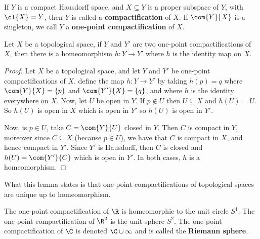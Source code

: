 \begin{definition}
    If $Y$ is a compact Hausdorff space, and  $X \subseteq Y$ is a proper
    subspace of  $Y$, with  $\cl{X}=Y$, then $Y$ is called a
    \textbf{compactification} of $X$. If  $\com{Y}{X}$ is a singleton, we call
    $Y$ a  \textbf{one-point compactification} of $X$.
\end{definition}

\begin{lemma}\label{3.8.2}
    Let $X$ be a topological space, if $Y$ and $Y'$ are two one-point
    compactifications of $X$, then there is a homeomorphism $h:Y \rightarrow Y'$
    where $h$ is the identity map on  $X$.
\end{lemma}
\begin{proof}
    Let $X$ be a topological space, and let  $Y$ and  $Y'$ be one-point
    compactifications of  $X$. define the map $h:Y \rightarrow Y'$ by taking
    $h(p)=q$ where $\com{Y}{X}=\{p\}$ and $\com{Y'}{X}=\{q\}$, and where $h$ is
    the identity everywhere on  $X$. Now, let  $U$ be open in  $Y$. If $p
    \notin U$ then  $U \subseteq X$ and  $h(U)=U$. So $h(U)$ is open in  $X$
    which is open in $Y'$ so $h(U)$ is open in $Y'$.

    Now, is  $p \in U$, take  $C=\com{{Y}}{U}$ closed in $Y$. Then  $C$ is
    compact in  $Y$, moreover since  $C \subseteq X$  (because $p \in U$), we
    have that $C$ is compact in  $X$, and hence compact in  $Y'$. Since $Y'$ is
    Hausdorff, then $C$ is closed and $h(U)=\com{Y'}{C}$ which is open in $Y'$.
    In both cases,  $h$ is a homeomorphism.
\end{proof}
\begin{remark}
    What this lemma states is that one-point compactifications of topological
    spaces are unique up to homeomorphism.
\end{remark}

\begin{example}\label{3.13}
    The one-point compactification of $\R$ is homeomorphic to the unit circle
    $S^1$. The one-point compactification of $\R^2$ is the unit sphere  $S^2$.
    The one-point compactification of $\C$ is denoted  $\C \cup \infty$ and is
    called the \textbf{Riemann sphere}.
\end{example}

